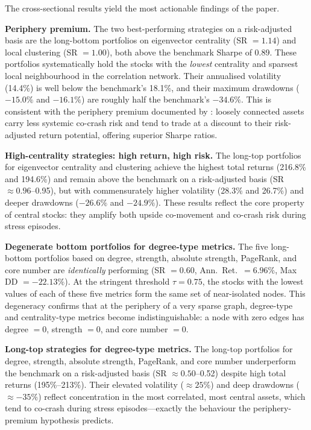 \documentclass{article}
\begin{document}
The cross-sectional results yield the most actionable findings of the paper.

\textbf{Periphery premium.} The two best-performing strategies on a risk-adjusted basis are the long-bottom portfolios on eigenvector centrality (SR $= 1.14$) and local clustering (SR $= 1.00$), both above the benchmark Sharpe of 0.89. These portfolios systematically hold the stocks with the \emph{lowest} centrality and sparsest local neighbourhood in the correlation network. Their annualised volatility (14.4\%) is well below the benchmark's 18.1\%, and their maximum drawdowns ($-15.0\%$ and $-16.1\%$) are roughly half the benchmark's $-34.6\%$. This is consistent with the periphery premium documented by \cite{pozzi2013}: loosely connected assets carry less systemic co-crash risk and tend to trade at a discount to their risk-adjusted return potential, offering superior Sharpe ratios.

\textbf{High-centrality strategies: high return, high risk.} The long-top portfolios for eigenvector centrality and clustering achieve the highest total returns (216.8\% and 194.6\%) and remain above the benchmark on a risk-adjusted basis (SR $\approx 0.96$--0.95), but with commensurately higher volatility (28.3\% and 26.7\%) and deeper drawdowns ($-26.6\%$ and $-24.9\%$). These results reflect the core property of central stocks: they amplify both upside co-movement and co-crash risk during stress episodes.

\textbf{Degenerate bottom portfolios for degree-type metrics.} The five long-bottom portfolios based on degree, strength, absolute strength, PageRank, and core number are \emph{identically} performing (SR $= 0.60$, Ann.\ Ret.\ $= 6.96\%$, Max DD $= -22.13\%$). At the stringent threshold $\tau = 0.75$, the stocks with the lowest values of each of these five metrics form the same set of near-isolated nodes. This degeneracy confirms that at the periphery of a very sparse graph, degree-type and centrality-type metrics become indistinguishable: a node with zero edges has degree $= 0$, strength $= 0$, and core number $= 0$.

\textbf{Long-top strategies for degree-type metrics.} The long-top portfolios for degree, strength, absolute strength, PageRank, and core number underperform the benchmark on a risk-adjusted basis (SR $\approx 0.50$--0.52) despite high total returns (195\%--213\%). Their elevated volatility ($\approx 25\%$) and deep drawdowns ($\approx -35\%$) reflect concentration in the most correlated, most central assets, which tend to co-crash during stress episodes---exactly the behaviour the periphery-premium hypothesis predicts.
\end{document}
